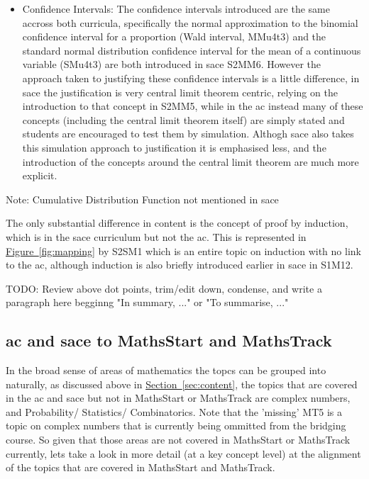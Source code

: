 \documentclass[twoside,12pt,a4paper]{report}
\newcommand{\refsec}[1]{\hyperref[sec:#1]{Section~\ref{sec:#1}}}
\newcommand{\reffig}[1]{\hyperref[fig:#1]{Figure~\ref{fig:#1}}}
\begin{document}
\begin{itemize}
\begin{itemize}
			\item Confidence Intervals: The confidence intervals introduced are the same accross both curricula, specifically the normal approximation to the binomial confidence interval for a proportion (Wald interval, MMu4t3) and the standard normal distribution confidence interval for the mean of a continuous variable (SMu4t3) are both introduced in \gls{sace} S2MM6. However the approach taken to justifying these confidence intervals is a little difference, in \gls{sace} the justification is very central limit theorem centric, relying on the introduction to that concept in S2MM5, while in the \gls{ac} instead many of these concepts (including the central limit theorem itself) are simply stated and students are encouraged to test them by simulation. Althogh \gls{sace} also takes this simulation approach to justification it is emphasised less, and the introduction of the concepts around the central limit theorem are much more explicit.
		\end{itemize}
\end{itemize}

Note: Cumulative Distribution Function not mentioned in \gls{sace}

The only substantial difference in content is the concept of proof by induction, which is in the \gls{sace} curriculum but not the \gls{ac}. This is represented in \reffig{mapping} by S2SM1 which is an entire topic on induction with no link to the \gls{ac}, although induction is also briefly introduced earlier in \gls{sace} in S1M12.


TODO: Review above dot points, trim/edit down, condense, and write a paragraph here begginng "In summary, ..." or "To summarise, ..." 



\subsection{\gls{ac} and \gls{sace} to MathsStart and MathsTrack}

In the broad sense of areas of mathematics the topcs can be grouped into naturally, as discussed above in \refsec{content}, the topics that are covered in the \gls{ac} and \gls{sace} but not in MathsStart or MathsTrack are complex numbers, and Probability/ Statistics/ Combinatorics. Note that the 'missing' MT5 is a topic on complex numbers that is currently being ommitted from the bridging course. So given that those areas are not covered in MathsStart or MathsTrack currently, lets take a look in more detail (at a key concept level) at the alignment of the topics that are covered in MathsStart and MathsTrack.
\end{document}

